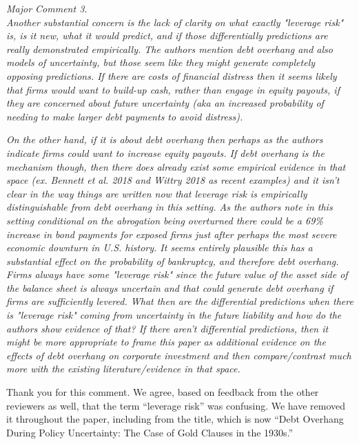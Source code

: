 \noindent \textit{\textcolor{red!60!black}{
Major Comment 3.\\
Another substantial concern is the lack of clarity on what exactly "leverage risk" is, is it new, what it would predict, and if those differentially predictions are really demonstrated empirically. The authors mention debt overhang and also models of uncertainty, but those seem like they might generate completely opposing predictions. If there are costs of financial distress then it seems likely that firms would want to build-up cash, rather than engage in equity payouts, if they are concerned about future uncertainty (aka an increased probability of needing to make larger debt payments to avoid distress). 
}}

\textit{\textcolor{red!60!black}{
On the other hand, if it is about debt overhang then perhaps as the authors indicate firms could want to increase equity payouts. If debt overhang is the mechanism though, then there does already exist some empirical evidence in that space (ex. Bennett et al. 2018 and Wittry 2018 as recent examples) and it isn't clear in the way things are written now that leverage risk is empirically distinguishable from debt overhang in this setting. As the authors note in this setting conditional on the abrogation being overturned there could be a 69\% increase in bond payments for exposed firms just after perhaps the most severe economic downturn in U.S. history. It seems entirely plausible this has a substantial effect on the probability of bankruptcy, and therefore debt overhang. Firms always have some "leverage risk" since the future value of the asset side of the balance sheet is always uncertain and that could generate debt overhang if firms are sufficiently levered. What then are the differential predictions when there is "leverage risk" coming from uncertainty in the future liability and how do the authors show evidence of that? If there aren't differential predictions, then it might be more appropriate to frame this paper as additional evidence on the effects of debt overhang on corporate investment and then compare/contrast much more with the existing literature/evidence in that space.
}}

\bigskip

\noindent Thank you for this comment. We agree, based on feedback from the other reviewers as well, that the term ``leverage risk'' was confusing. We have removed it throughout the paper, including from the title, which is now ``Debt Overhang During Policy Uncertainty: The Case of Gold Clauses in the 1930s.''

